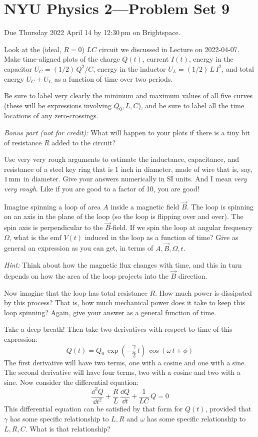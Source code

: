 \documentclass[12pt]{article}
\begin{document}
\section*{NYU Physics 2---Problem Set 9}

Due Thursday 2022 April 14 by 12:30\,pm on Brightspace.

\startproblem%
Look at the (ideal, $R=0$) $LC$ circuit we discussed in Lecture on
2022-04-07. Make time-aligned plots of the charge
$Q(t)$, current $I(t)$, energy in the capacitor $U_C=(1/2)\,Q^2/C$,
energy in the inductor $U_L=(1/2)\,L\,I^2$, and total energy $U_C+U_L$
as a function of time over two periods.

Be sure to label very clearly the minimum and maximum values of all
five curves (these will be expressions involving $Q_0, L, C$), and be
sure to label all the time locations of any zero-crossings.

\textsl{Bonus part (not for credit):} What will happen to your plots
if there is a tiny bit of resistance $R$ added to the circuit?

\startproblem%
Use very very rough arguments to estimate the inductance, capacitance,
and resistance of a steel key ring that is 1 inch in diameter, made of
wire that is, say, $1\,\mathrm{mm}$ in diameter. Give your answers numerically
in SI units.
And I mean \emph{very very rough}. Like if you are good to a factor of
10, you are good!

\startproblem%
Imagine spinning a loop of area $A$ inside a magnetic field $\vec{B}$.
The loop is spinning on an axis in the plane of the loop (so the loop
is flipping over and over).  The spin axis is perpendicular to the
$\vec{B}$-field.  If we spin the loop at angular frequency $\Omega$,
what is the emf $V(t)$ induced in the loop as a function of time? Give as
general an expression as you can get, in terms of $A, \vec{B}, \Omega, t$.

\textsl{Hint:} Think about how the magnetic flux changes with time,
and this in turn depends on how the area of the loop projects into the
$\vec{B}$ direction.

Now imagine that the loop has total resistance $R$. How much power is
dissipated by this process? That is, how much mechanical power does it
take to keep this loop spinning? Again, give your answer as a general function of time.

\startproblem%
Take a deep breath!
Then take two derivatives with respect to time of this expression:
\begin{equation}
  Q(t) = Q_0\,\exp(-\frac{\gamma}{2}\,t)\,\cos(\omega\,t+\phi)
\end{equation}
The first derivative will have two terms, one with a cosine and one
with a sine. The second derivative will have four terms, two with a
cosine and two with a sine. Now consider the differential equation:
\begin{equation}
  \frac{\dd^2 Q}{\dd t^2} + \frac{R}{L}\,\frac{\dd Q}{\dd t} + \frac{1}{LC}\,Q = 0
\end{equation}
This differential equation can be satisfied by that form for $Q(t)$,
provided that $\gamma$ has some specific relationship to $L, R$ and
$\omega$ has some specific relationship to $L, R, C$. What is that
relationship?
\end{document}
